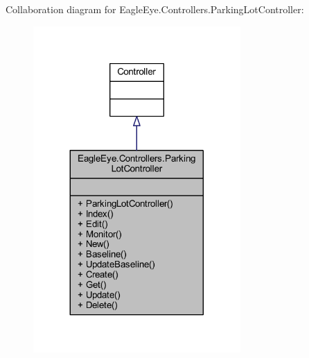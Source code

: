 Collaboration diagram for Eagle\+Eye.\+Controllers.\+Parking\+Lot\+Controller\+:\nopagebreak
\begin{figure}[H]
\begin{center}
\leavevmode
\includegraphics[width=224pt]{class_eagle_eye_1_1_controllers_1_1_parking_lot_controller__coll__graph}
\end{center}
\end{figure}
